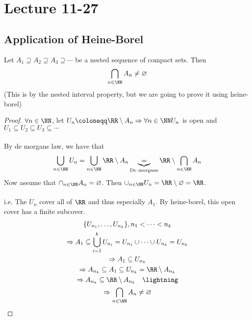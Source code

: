 \documentclass[class=scrartcl, crop=false]{standalone}
\date{2019-11-27}
\begin{document}
\section{Lecture 11-27}

\subsection{Application of Heine-Borel}

\begin{theorem}
  Let $A_1 \supseteq A_2 \supseteq A_3 \supseteq \cdots$ be a nested sequence of compact sets. Then 
  \begin{gather*}
    \bigcap_{n \in \NN} A_n \neq \varnothing
  \end{gather*} 
  (This is by the nested interval property, but we are going to prove it using heine-borel)
  \begin{proof}
    $\forall n \in \NN$, let $U_n \coloneqq \RR \setminus A_n \Rightarrow \forall n \in \NN U_n$ is open and $U_1 \subseteq U_2 \subseteq U_3 \subseteq \cdots$ 
    \\\\

    By de morgans law, we have that
    \begin{gather*}
      \bigcup_{n \in \NN}U_n 
      = \bigcup_{n \in \NN}\RR \setminus A_n 
      \underbrace{=}_{\text{De morgans}} \RR \setminus \bigcap_{n \in \NN}A_n
    \end{gather*} 
    Now assume that $\cap_{n \in \NN}A_n = \varnothing$. Then $\cup_{n \in \NN}U_n = \RR \setminus \varnothing = \RR$.
    \\\\
    i.e. The $U_n$ cover all of $\RR$ and thus especially $A_1$. By heine-borel, this open cover has a finite subcover.
    \begin{gather*}
      \{U_{n_1}, \dots, U_{n_k}\}, n_1 < \dots < n_k \\
      \Rightarrow
      A_1 \subseteq \bigcup_{i = 1}^{k}U_{n_i} = U_{n_1}\cup\cdots\cup U_{n_k} = U_{n_k}
      \\
      \Rightarrow A_1 \subseteq U_{n_k} \\
      \Rightarrow A_{n_k} \subseteq A_1 \subseteq U_{n_k} = \RR \setminus A_{n_k} \\
      \Rightarrow A_{n_k} \subseteq \RR \setminus A_{n_k} \quad \text{\lightning}
      \\
      \Rightarrow \bigcap_{n \in \NN}A_n \neq \varnothing
    \end{gather*} 
  \end{proof} 
\end{theorem} 
\end{document}
